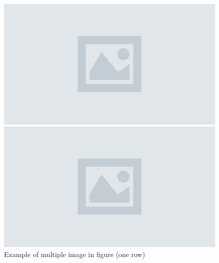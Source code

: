 \begin{figure}[H]
    \centering
    \begin{minipage}{0.45\textwidth}
        \centering
        \includegraphics[width=\linewidth]{img/dummy.jpg}
    \end{minipage}%
    \hfill
    \begin{minipage}{0.45\textwidth}
        \centering
        \includegraphics[width=\linewidth]{img/dummy.jpg}
    \end{minipage} %
    \caption{Example of multiple image in figure (one row)} %
\end{figure}